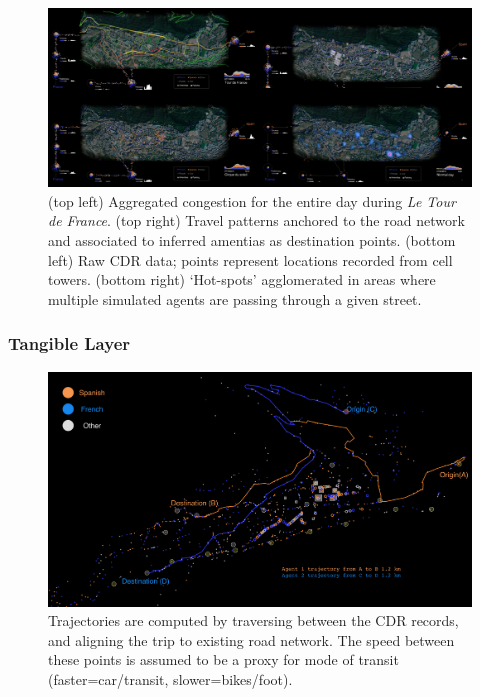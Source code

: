 {{{            \begin{figure}[h]
                \begin{center}
                    \includegraphics[width=1\textwidth]{chapters/insight/and_abm/figures/and_cdr_viz.png}
                \end{center}
                \caption{
                    (top left) Aggregated congestion for the entire day during \textit{Le Tour de France}. (top right) Travel patterns anchored to the road network and associated to inferred amentias as destination points. (bottom left) Raw CDR data; points represent locations recorded from cell towers. (bottom right) `Hot-spots' agglomerated in areas where multiple simulated agents are passing through a given street.
                }
                \label{fig:and_cdr_viz}
            \end{figure}
        }

        \subsubsection{Tangible Layer}
        {
            \begin{figure}[h]
                \begin{center}
                    \includegraphics[width=1\textwidth]{chapters/insight/and_abm/figures/trajectory.png}
                \end{center}
                \caption{Trajectories are computed by traversing between the CDR records, and aligning the trip to existing road network. The speed between these points is assumed to be a proxy for mode of transit (faster=car/transit, slower=bikes/foot).}
                \label{fig:and_trajectories}
            \end{figure}

}}}
